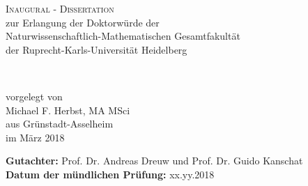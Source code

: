 \begin{titlepage}
\begin{center}

	\Huge \textsc{Inaugural - Dissertation} \\[0.4cm]
	{\Large zur Erlangung der Doktorwürde der \\
	Naturwissenschaftlich-Mathematischen Gesamtfakultät \\
	der Ruprecht-Karls-Universität Heidelberg\\
	}

	\vfill

	{\Huge
	\textbf{\thesistitle}\\
	\vspace{0.5cm}
	\LARGE \thesissubtitle
	}

	\vfill

	\vfill

	{\large  vorgelegt von} \\
	\vspace{1.0cm}
	{\LARGE Michael F. Herbst, {\large \mbox{MA} \mbox{MSci}} }\\[-0.3em]
	{\large aus Grünstadt-Asselheim } \\
	\vspace{1.0cm}
	{\large im März 2018} \\

	\vspace{2cm}

	\begin{flushleft}
	\normalsize
		\textbf{Gutachter:} \qquad Prof. Dr. Andreas Dreuw \hfill und \hfill Prof. Dr. Guido Kanschat\\
		\textbf{Datum der mündlichen Prüfung:} \qquad xx.yy.2018
	\end{flushleft}
\end{center}
\end{titlepage}
